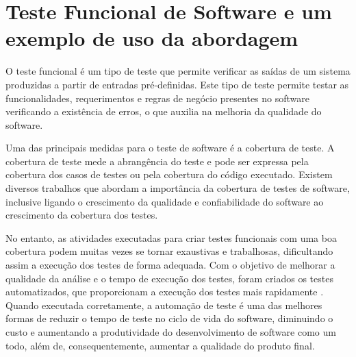 \documentclass[12pt]{article}
\begin{document}



\section{Teste Funcional de Software e um exemplo de uso da abordagem}
O teste funcional é um tipo de teste que permite verificar as saídas de um sistema produzidas a partir de entradas pré-definidas. Este tipo de teste permite testar as funcionalidades, requerimentos e regras de negócio presentes no software\cite{molinari2003testes} verificando a existência de erros, o que auxilia na melhoria da qualidade do software.

Uma das principais medidas para o teste de software é a cobertura de teste. A cobertura de teste mede a abrangência do teste e pode ser expressa pela cobertura dos casos de testes ou pela cobertura do código executado. Existem diversos trabalhos que abordam a importância da cobertura de testes de software\cite{zhu1997software,bieman1996using}, inclusive ligando o crescimento da qualidade e confiabilidade do software ao crescimento da cobertura dos testes\cite{malaiya2002software}.


No entanto, as atividades executadas para criar testes funcionais com uma boa cobertura podem muitas vezes se tornar exaustivas e trabalhosas, dificultando assim a execução dos testes de forma adequada. Com o objetivo de melhorar a qualidade da análise e o tempo de execução dos testes, foram criados os testes automatizados, que proporcionam a execução dos testes mais rapidamente \cite{fantinato2005autotest}. Quando executada corretamente, a automação de teste é uma das melhores formas de reduzir o tempo de teste no ciclo de vida do software, diminuindo o custo e aumentando a produtividade do desenvolvimento de software como um todo, além de, consequentemente, aumentar a qualidade do produto final.
\end{document}
